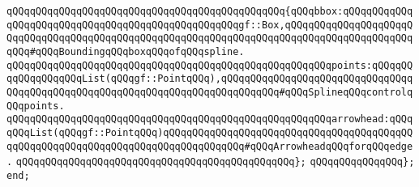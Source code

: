 \verb|qQQqqQQqqQQqqQQqqQQqqQQqqQQqqQQqqQQqqQQqqQQqqQQq{qQQqbbox:qQQqqQQqqQQqqQQqqQQqqQQqqQQqqQQqqQQqqQQqqQQqqQQqqQQqgf::Box,qQQqqQQqqQQqqQQqqQQqqQQqqQQqqQQqqQQqqQQqqQQqqQQqqQQqqQQqqQQqqQQqqQQqqQQqqQQqqQQqqQQqqQQqqQQqqQQq#qQQqBoundingqQQqboxqQQqofqQQqspline.|\newline
\verb|qQQqqQQqqQQqqQQqqQQqqQQqqQQqqQQqqQQqqQQqqQQqqQQqqQQqqQQqpoints:qQQqqQQqqQQqqQQqqQQqList(qQQqgf::PointqQQq),qQQqqQQqqQQqqQQqqQQqqQQqqQQqqQQqqQQqqQQqqQQqqQQqqQQqqQQqqQQqqQQqqQQqqQQqqQQqqQQq#qQQqSplineqQQqcontrolqQQqpoints.|\newline
\verb|qQQqqQQqqQQqqQQqqQQqqQQqqQQqqQQqqQQqqQQqqQQqqQQqqQQqqQQqarrowhead:qQQqqQQqList(qQQqgf::PointqQQq)qQQqqQQqqQQqqQQqqQQqqQQqqQQqqQQqqQQqqQQqqQQqqQQqqQQqqQQqqQQqqQQqqQQqqQQqqQQqqQQqqQQq#qQQqArrowheadqQQqforqQQqedge.|\newline
\verb|qQQqqQQqqQQqqQQqqQQqqQQqqQQqqQQqqQQqqQQqqQQqqQQq};|\newline
\verb|qQQqqQQqqQQqqQQq};|\newline
\newline
\verb|end;|\newline

